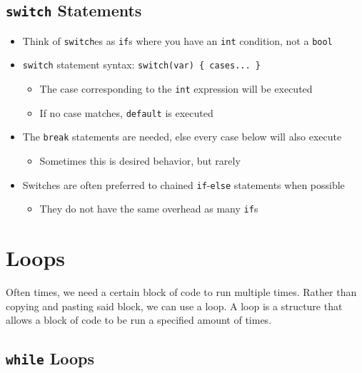 \documentclass{article}
\begin{document}
\subsection{\texttt{switch} Statements}

\begin{itemize}
	\item Think of \texttt{switch}es as \texttt{if}s where you have an \texttt{int} condition, not a \texttt{bool}
	\item \texttt{switch} statement syntax: \texttt{switch(var) \{ cases... \}}
	\begin{itemize}
		\item The case corresponding to the \texttt{int} expression will be executed
		\item If no case matches, \texttt{default} is executed
	\end{itemize}
	\item The \texttt{break} statements are needed, else every case below will also execute
	\begin{itemize} \item Sometimes this is desired behavior, but rarely \end{itemize}
	\item Switches are often preferred to chained \texttt{if}-\texttt{else} statements when possible
	\begin{itemize}
		\item They do not have the same overhead as many \texttt{if}s
	\end{itemize}
\end{itemize}

\section{Loops}

\noindent
Often times, we need a certain block of code to run multiple times. Rather than copying and pasting said block, we can use a loop. A loop is a structure that allows a block of code to be run a specified amount of times.

\subsection{\texttt{while} Loops}
\end{document}
